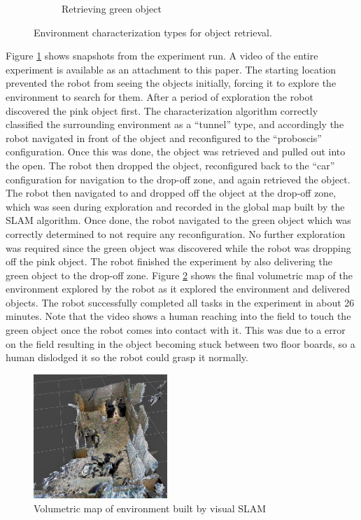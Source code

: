 \documentclass[conference]{IEEEtran}
\begin{document}
\begin{figure}[t]
\begin{subfigure}[t]{0.32\textwidth}
        \caption{Retrieving green object}
    \end{subfigure}
      \caption{Environment characterization types for object retrieval.}
      \label{fig:demo}
   \end{figure}

Figure \ref{fig:demo} shows snapshots from the experiment run. A video of the entire experiment is available as an attachment to this paper. The starting location prevented the robot from seeing the objects initially, forcing it to explore the environment to search for them. After a period of exploration the robot discovered the pink object first. The characterization algorithm correctly classified the surrounding environment as a ``tunnel'' type, and accordingly the robot navigated in front of the object and reconfigured to the ``proboscis'' configuration. Once this was done, the object was retrieved and pulled out into the open. The robot then dropped the object, reconfigured back to the ``car'' configuration for navigation to the drop-off zone, and again retrieved the object. The robot then navigated to and dropped off the object at the drop-off zone, which was seen during exploration and recorded in the global map built by the SLAM algorithm. Once done, the robot navigated to the green object which was correctly determined to not require any reconfiguration. No further exploration was required since the green object was discovered while the robot was dropping off the pink object. The robot finished the experiment by also delivering the green object to the drop-off zone. Figure \ref{fig:octomap} shows the final volumetric map of the environment explored by the robot as it explored the environment and delivered objects. The robot successfully completed all tasks in the experiment in about 26 minutes. Note that the video shows a human reaching into the field to touch the green object once the robot comes into contact with it. This was due to a error on the field resulting in the object becoming stuck between two floor boards, so a human dislodged it so the robot could grasp it normally.

\begin{figure}
\begin{center}
\includegraphics[width=0.45\textwidth]{images/octomap.png}
\caption{Volumetric map of environment built by visual SLAM}
\label{fig:octomap}
\end{center}
\end{figure}
\end{document}
